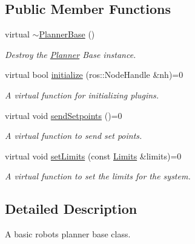 \subsection*{Public Member Functions}
\begin{DoxyCompactItemize}
\item 
\mbox{\label{classplanner__interface_1_1PlannerBase_ab38d1aeb7b71b9f9f66b1a136d5861b3}} 
virtual \hyperlink{classplanner__interface_1_1PlannerBase_ab38d1aeb7b71b9f9f66b1a136d5861b3}{$\sim$\+Planner\+Base} ()
\begin{DoxyCompactList}\small\item\em Destroy the \hyperlink{classPlanner}{Planner} Base instance. \end{DoxyCompactList}\item 
virtual bool \hyperlink{classplanner__interface_1_1PlannerBase_a38f9005d56266347b20f5a0cd400a2db}{initialize} (ros\+::\+Node\+Handle \&nh)=0
\begin{DoxyCompactList}\small\item\em A virtual function for initializing plugins. \end{DoxyCompactList}\item 
\mbox{\label{classplanner__interface_1_1PlannerBase_aa75b7362c9503c05519e9f09e9ce55c6}} 
virtual void \hyperlink{classplanner__interface_1_1PlannerBase_aa75b7362c9503c05519e9f09e9ce55c6}{send\+Setpoints} ()=0
\begin{DoxyCompactList}\small\item\em A virtual function to send set points. \end{DoxyCompactList}\item 
virtual void \hyperlink{classplanner__interface_1_1PlannerBase_a7f8186e617225bb48183d619930d950a}{set\+Limits} (const \hyperlink{structLimits}{Limits} \&limits)=0
\begin{DoxyCompactList}\small\item\em A virtual function to set the limits for the system. \end{DoxyCompactList}\end{DoxyCompactItemize}


\subsection{Detailed Description}
A basic robot\textquotesingle{}s planner base class. 

